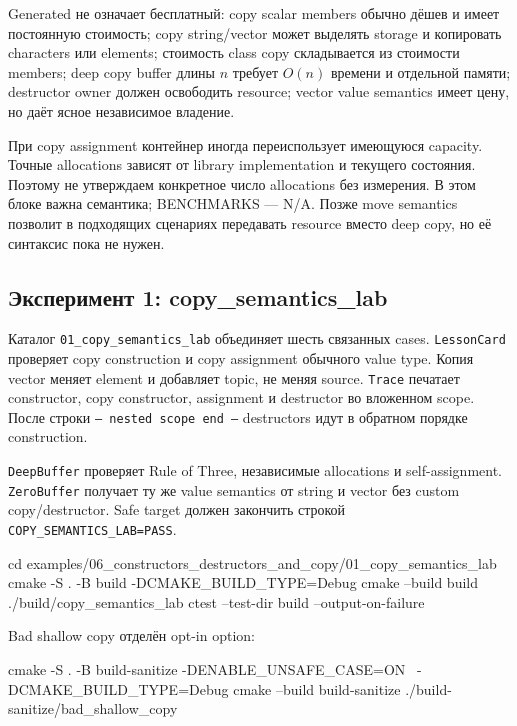 Generated не означает бесплатный:
copy scalar members обычно дёшев и имеет постоянную стоимость; copy string/vector может выделять storage и копировать characters или elements; стоимость class copy складывается из стоимости members; deep copy buffer длины $n$ требует $O(n)$ времени и отдельной памяти; destructor owner должен освободить resource; vector value semantics имеет цену, но даёт ясное независимое владение.

При copy assignment контейнер иногда переиспользует имеющуюся capacity.
Точные allocations зависят от library implementation и текущего состояния. Поэтому
не утверждаем конкретное число allocations без измерения. В этом блоке важна
семантика; BENCHMARKS --- N/A. Позже move semantics позволит в подходящих
сценариях передавать resource вместо deep copy, но её синтаксис пока не нужен.

\subsection{Эксперимент 1: copy\_semantics\_lab}

Каталог \texttt{01\_copy\_semantics\_lab} объединяет шесть связанных cases.
\texttt{LessonCard} проверяет copy construction и copy assignment обычного
value type. Копия vector меняет element и добавляет topic, не меняя source.
\texttt{Trace} печатает constructor, copy constructor, assignment и
destructor во вложенном scope. После строки \texttt{-- nested scope end --}
destructors идут в обратном порядке construction.

\texttt{DeepBuffer} проверяет Rule of Three, независимые allocations и
self-assignment. \texttt{ZeroBuffer} получает ту же value semantics от string
и vector без custom copy/destructor. Safe target должен закончить строкой
\texttt{COPY\_SEMANTICS\_LAB=PASS}.

\begin{shellcode}
cd examples/06_constructors_destructors_and_copy/01_copy_semantics_lab
cmake -S . -B build -DCMAKE_BUILD_TYPE=Debug
cmake --build build
./build/copy_semantics_lab
ctest --test-dir build --output-on-failure
\end{shellcode}

Bad shallow copy отделён opt-in option:

\begin{shellcode}
cmake -S . -B build-sanitize -DENABLE_UNSAFE_CASE=ON \
  -DCMAKE_BUILD_TYPE=Debug
cmake --build build-sanitize
./build-sanitize/bad_shallow_copy
\end{shellcode}

